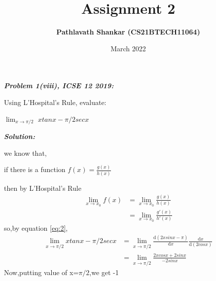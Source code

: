 \documentclass[journal,12pt,twocolumn]{IEEEtran}
\begin{document}
\newcommand{\myvec}[1]{\ensuremath{\begin{pmatrix}#1\end{pmatrix}}}

\let\vec\mathbf


\title{Assignment 2}
\author{\textbf{Pathlavath Shankar (CS21BTECH11064)}}
\maketitle
\date {March 2022}


\textbf{\textit{Problem 1(viii), ICSE 12 2019:}}

Using L’Hospital’s Rule, evaluate:

 $\lim_{x\to\pi/2}$ ${xtanx- \pi/2secx}$

\textbf{\textit{Solution:}}

we know that,

if there is a function $f(x)=\frac{g(x)}{h(x)}$

then by L’Hospital’s Rule 
\begin{align}
\lim_{x\to x_0} f(x)&=\lim_{x\to x_0} \frac{g(x)}{h(x)}  \\
\label{eq:2}
&=\lim_{x\to x_0} \frac{g'(x)}{h'(x)}
\end{align}
so,by equation \eqref{eq:2},
\begin{align}
\lim_{x\to\pi/2} {xtanx- \pi/2secx}&=\lim_{x\to\pi/2}
 {\frac{\mathrm{d}(2xsinx-\pi)}{\mathrm{d}x}\frac{\mathrm{d}x}{\mathrm{d}(2cosx)}} \\
&=\lim_{x\to\pi/2}\frac{2xcosx + 2sinx}{-2sinx}
\end{align}
Now,putting value of x=$\pi/2$,we get  {-1}       \\
\end{document}
